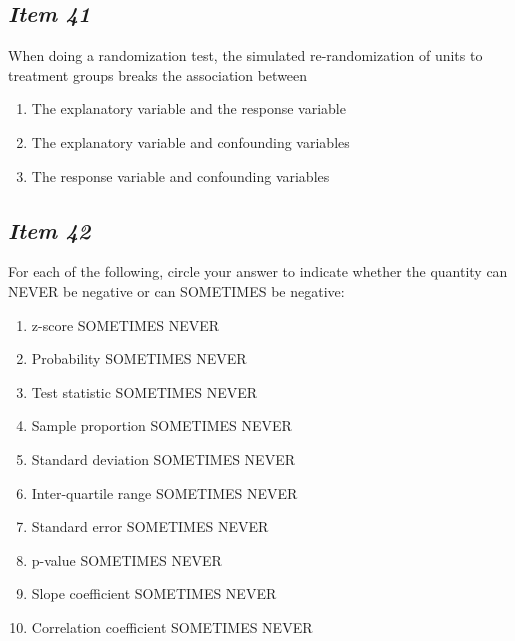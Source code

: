 \subsection{\textbf{\textit{Item 41}}}


When doing a randomization test, the simulated re-randomization of units to
treatment groups breaks the association between
\begin{enumerate} [leftmargin=2cm, itemsep=.2em]


\item The explanatory variable and the response variable


\item The explanatory variable and confounding variables


\item The response variable and confounding variables


\end{enumerate}





\subsection{\textbf{\textit{Item 42}}}


For each of the following, circle your answer to indicate whether the quantity can NEVER be negative or can SOMETIMES be negative:


\begin{enumerate} [leftmargin=1cm, itemsep=.2em]


\item z-score SOMETIMES NEVER


\item Probability SOMETIMES NEVER


\item Test statistic SOMETIMES NEVER


\item Sample proportion SOMETIMES NEVER


\item Standard deviation SOMETIMES NEVER


\item Inter-quartile range SOMETIMES NEVER


\item Standard error SOMETIMES NEVER


\item p-value SOMETIMES NEVER


\item Slope coefficient SOMETIMES NEVER


\item Correlation coefficient SOMETIMES NEVER


\end{enumerate}





